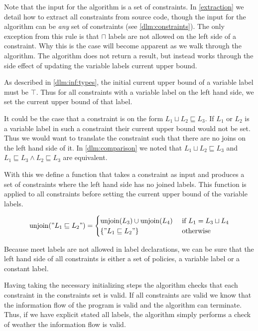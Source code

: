 Note that the input for the algorithm is a set of constraints.
In \cref{extraction} we detail how to extract all constraints from source code, though the input for the algorithm can be \textit{any} set of constraints (see \cref{dlm:constraints}).
The only exception from this rule is that $\sqcap$ labels are not allowed on the left side of a constraint.
Why this is the case will become apparent as we walk through the algorithm.
The algorithm does not return a result, but instead works through the side effect of updating the variable labels current upper bound.



As described in \cref{dlm:inf:types}, the initial current upper bound of a variable label must be $\top$.
Thus for all constraints with a variable label on the left hand side, we set the current upper bound of that label.

It could be the case that a constraint is on the form $L_1 \sqcup L_2 \sqsubseteq L_3$.
If $L_1$ or $L_2$ is a variable label in such a constraint their current upper bound would not be set.
Thus we would want to translate the constraint such that there are no joins on the left hand side of it.
In \cref{dlm:comparison} we noted that $L_1 \sqcup L_2 \sqsubseteq L_3$ and $L_1 \sqsubseteq L_3 \wedge L_2 \sqsubseteq L_3$ are equivalent.

With this we define a function that takes a constraint as input and produces a set of constraints where the left hand side has no joined labels.
This function is applied to all constraints before setting the current upper bound of the variable labels.

\[
\text{unjoin}("L_1 \sqsubseteq L_2") =
\begin{cases}
  \text{unjoin}(L_3) \cup \text{unjoin}(L_4) & \text{ if } L_1 = L_3 \sqcup L_4\\
  \{"L_1 \sqsubseteq L_2"\} & \text{ otherwise}
\end{cases}
\]

Because meet labels are not allowed in label declarations, we can be sure that the left hand side of all constraints is either a set of policies, a variable label or a constant label.

Having taking the necessary initializing steps the algorithm checks that each constraint in the constraints set is valid.
If all constraints are valid we know that the information flow of the program is valid and the algorithm can terminate.
Thus, if we have explicit stated all labels, the algorithm simply performs a check of weather the information flow is valid.

